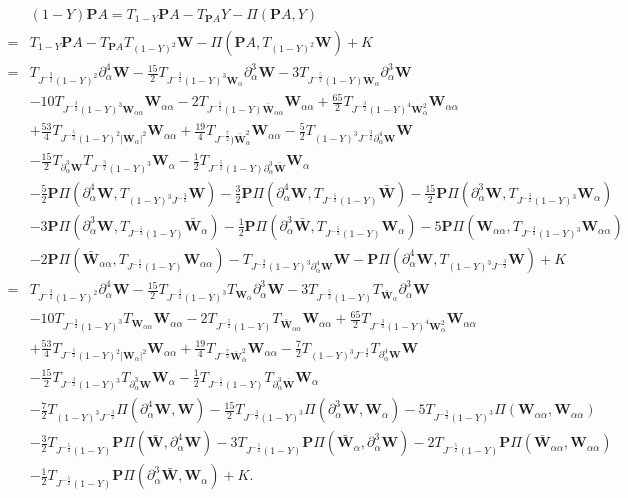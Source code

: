 \documentclass[10pt]{amsart}
\theoremstyle{remark}
\theoremstyle{definition}
\numberwithin{equation}{section}
\newcommand{\p}{\partial}
\newcommand{\al}{\alpha}
\newcommand{\f}{\frac}
\newcommand{\bw}{\mathbf{W}}
\newcommand{\nP}{{\mathbf P}}
\begin{document}
\begin{align*}
&(1-Y)\nP A=T_{1-Y}\nP A-T_{\nP A}Y-\Pi(\nP A,Y)\\
=&T_{1-Y}\nP A-T_{\nP A}T_{(1-Y)^2}\bw-\Pi(\nP A,T_{(1-Y)^2}\bw)+K\\
=&T_{J^{-\f32}(1-Y)^2}\p^4_{\al}\bw-\f{15}{2}T_{J^{-\f32}(1-Y)^3\bw_{\al}}\p^{3}_{\al}\bw-3 T_{J^{-\f52}(1-Y)\bar{\bw}_{\al}}\p^3_{\al}\bw\\
&-10T_{J^{-\f32}(1-Y)^3\bw_{\al\al}}\bw_{\al\al}-2 T_{J^{-\f52}(1-Y)\bar{\bw}_{\al\al}}
\bw_{\al\al}+\f{65}{2}T_{J^{-\f32}(1-Y)^4\bw_{\al}^2}\bw_{\al\al}\\
&+\f{53}{4}T_{J^{-\f52}(1-Y)^2|\bw_{\al}|^2}\bw_{\al\al}+\f{19}{4}T_{J^{-\f72})\bar{\bw}_{\al}^2}\bw_{\al\al}-\f52T_{(1-Y)^3J^{-\f32}\p^4_{\al}\bw}\bw\\
&-\f{15}{2}T_{\p^3_{\al}\bw}T_{J^{-\f32}(1-Y)^3}\bw_{\al}-\f12 T_{J^{-\f52}(1-Y)\p^3_{\al}\bar{\bw}}
\bw_{\al}\\
&-\f52\nP\Pi(\p^4_{\al}\bw,T_{(1-Y)^3J^{-\f32}}\bw)-\f32\nP\Pi(\p^4_{\al}\bw, T_{J^{-\f52}(1-Y)}\bar{\bw}) -\f{15}{2}\nP\Pi(\p^3_{\al}\bw,T_{J^{-\f32}(1-Y)^3}\bw_{\al})\\
&-3 \nP\Pi(\p^3_{\al}\bw,T_{J^{-\f52}(1-Y)}\bar{\bw}_{\al})-\f12 \nP\Pi(\p^3_{\al}\bar{\bw},T_{J^{-\f52}(1-Y)}
\bw_{\al})-5\nP\Pi(\bw_{\al\al},T_{J^{-\f32}(1-Y)^3}\bw_{\al\al})\\
&-2 \nP\Pi(\bar{\bw}_{\al\al},T_{J^{-\f52}(1-Y)}
\bw_{\al\al})-T_{J^{-\f32}(1-Y)^3\p^4_{\al}\bw}\bw-\nP\Pi(\p^4_{\al}\bw,T_{(1-Y)^3J^{-\f32}}\bw)+K\\
=&T_{J^{-\f32}(1-Y)^2}\p^4_{\al}\bw-\f{15}{2}T_{J^{-\f32}(1-Y)^3}T_{\bw_{\al}}\p^{3}_{\al}\bw-3 T_{J^{-\f52}(1-Y)}T_{\bar{\bw}_{\al}}\p^3_{\al}\bw\\
&-10T_{J^{-\f32}(1-Y)^3}T_{\bw_{\al\al}}\bw_{\al\al}-2 T_{J^{-\f52}(1-Y)}T_{\bar{\bw}_{\al\al}}
\bw_{\al\al}+\f{65}{2}T_{J^{-\f32}(1-Y)^4\bw_{\al}^2}\bw_{\al\al}\\
&+\f{53}{4}T_{J^{-\f52}(1-Y)^2|\bw_{\al}|^2}\bw_{\al\al}+\f{19}{4}T_{J^{-\f72}\bar{\bw}_{\al}^2}\bw_{\al\al}-\f72T_{(1-Y)^3J^{-\f32}}T_{\p^4_{\al}\bw}\bw\\
&-\f{15}{2}T_{J^{-\f32}(1-Y)^3}T_{\p^3_{\al}\bw}\bw_{\al}-\f12 T_{J^{-\f52}(1-Y)}T_{\p^3_{\al}\bar{\bw}}
\bw_{\al}\\
&-\f72 T_{(1-Y)^3J^{-\f32}}\Pi(\p^4_{\al}\bw,\bw) -\f{15}{2}T_{J^{-\f32}(1-Y)^3}\Pi(\p^3_{\al}\bw,\bw_{\al}) -5T_{J^{-\f32}(1-Y)^3}\Pi(\bw_{\al\al},\bw_{\al\al})\\
&-\f32 T_{J^{-\f52}(1-Y)}\nP\Pi(\bar{\bw}, \p^4_{\al}\bw)-3 T_{J^{-\f52}(1-Y)}\nP\Pi(\bar{\bw}_{\al}, \p^3_{\al}\bw)-2 T_{J^{-\f52}(1-Y)}\nP\Pi(\bar{\bw}_{\al\al}, \bw_{\al\al})\\
&-\f12 T_{J^{-\f52}(1-Y)}\nP\Pi(\p^3_{\al}\bar{\bw}, \bw_{\al}) + K.
\end{align*}
\end{document}
